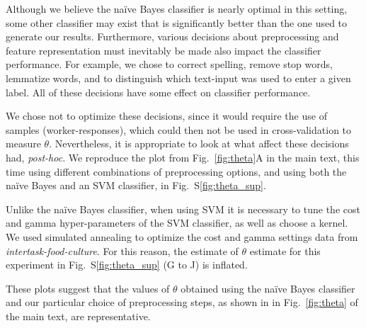 \documentclass[12pt]{article}
\begin{document}
Although we believe the na\"ive Bayes classifier is nearly optimal in this
setting, some other classifier may exist that is significantly better than 
the one used to generate our results.  Furthermore, various decisions about
preprocessing and feature representation must inevitably be made also
impact the classifier performance.  
For example, we chose to correct spelling, remove stop words,
lemmatize words, and to distinguish which text-input was used to enter a 
given label.  All of these decisions have some effect on classifier 
performance.

We chose not to optimize these decisions, since it would require the
use of samples (worker-responses), which could then not be used in 
cross-validation to measure $\theta$.  Nevertheless, it is
appropriate to look at what affect these decisions had, \textit{post-hoc}.  
We reproduce the plot from Fig.~\ref{fig:theta}A in the main text, 
this time using different combinations of preprocessing options,
and using both the na\"ive Bayes and an SVM classifier, in 
Fig.~S\ref{fig:theta_sup}.

Unlike the na\"ive Bayes classifier, when using SVM it is necessary to tune 
the cost and gamma hyper-parameters of the SVM classifier, as well as choose 
a kernel.  We used simulated annealing to optimize the cost and gamma settings
data from \textit{intertask-food-culture}.  For this reason, the estimate
of $\theta$ estimate for this experiment in 
Fig.~S\ref{fig:theta_sup} (G to J) is inflated. 

These plots suggest that the values of $\theta$ obtained using the 
na\"ive Bayes classifier and our particular choice of preprocessing steps, 
as shown in in Fig.~\ref{fig:theta} of the main text, are representative.
\end{document}
